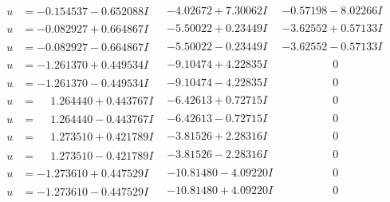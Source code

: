 \documentclass[1p]{elsarticle_modified}
\theoremstyle{definition}
\begin{document}
$$\begin{array}{c|c|c}
\begin{aligned}
u &= -0.154537 - 0.652088 I\end{aligned}
 & -4.02672 + 7.30062 I & -0.57198 - 8.02266 I \\ \hline\begin{aligned}
u &= -0.082927 + 0.664867 I\end{aligned}
 & -5.50022 + 0.23449 I & -3.62552 + 0.57133 I \\ \hline\begin{aligned}
u &= -0.082927 - 0.664867 I\end{aligned}
 & -5.50022 - 0.23449 I & -3.62552 - 0.57133 I \\ \hline\begin{aligned}
u &= -1.261370 + 0.449534 I\end{aligned}
 & -9.10474 + 4.22835 I & \phantom{-0.000000 } 0 \\ \hline\begin{aligned}
u &= -1.261370 - 0.449534 I\end{aligned}
 & -9.10474 - 4.22835 I & \phantom{-0.000000 } 0 \\ \hline\begin{aligned}
u &= \phantom{-}1.264440 + 0.443767 I\end{aligned}
 & -6.42613 + 0.72715 I & \phantom{-0.000000 } 0 \\ \hline\begin{aligned}
u &= \phantom{-}1.264440 - 0.443767 I\end{aligned}
 & -6.42613 - 0.72715 I & \phantom{-0.000000 } 0 \\ \hline\begin{aligned}
u &= \phantom{-}1.273510 + 0.421789 I\end{aligned}
 & -3.81526 + 2.28316 I & \phantom{-0.000000 } 0 \\ \hline\begin{aligned}
u &= \phantom{-}1.273510 - 0.421789 I\end{aligned}
 & -3.81526 - 2.28316 I & \phantom{-0.000000 } 0 \\ \hline\begin{aligned}
u &= -1.273610 + 0.447529 I\end{aligned}
 & -10.81480 - 4.09220 I & \phantom{-0.000000 } 0 \\ \hline\begin{aligned}
u &= -1.273610 - 0.447529 I\end{aligned}
 & -10.81480 + 4.09220 I & \phantom{-0.000000 } 0 \\ \hline\begin{aligned}

\end{aligned}
\end{array}$$
\end{document}

